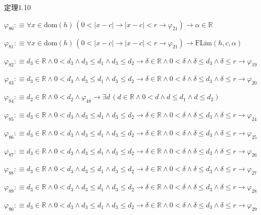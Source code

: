 \begin{fullproof}{定理1.10}
\begin{abbrevlist}
\item $\varphi_{80} :\equiv \forall x \in \mathrm{dom}(h)\,(0 < \lvert x - c \rvert \to \lvert x - c \rvert < r \to \varphi_{21}) \to \alpha \in \mathbb{R}$
\item $\varphi_{81} :\equiv \forall x \in \mathrm{dom}(h)\,(0 < \lvert x - c \rvert \to \lvert x - c \rvert < r \to \varphi_{21}) \to \mathrm{FLim}(h,c,\alpha)$
\item $\varphi_{82} :\equiv d_{3} \in \mathbb{R} \land 0 < d_{3} \land d_{3} \leq d_{1} \land d_{3} \leq d_{2} \to \delta \in \mathbb{R} \land 0 < \delta \land \delta \leq d_{3} \land \delta \leq r \to \varphi_{19}$
\item $\varphi_{83} :\equiv d_{3} \in \mathbb{R} \land 0 < d_{3} \land d_{3} \leq d_{1} \land d_{3} \leq d_{2} \to \delta \in \mathbb{R} \land 0 < \delta \land \delta \leq d_{3} \land \delta \leq r \to \varphi_{20}$
\item $\varphi_{84} :\equiv d_{2} \in \mathbb{R} \land 0 < d_{2} \land \varphi_{48} \to \exists d\,(d \in \mathbb{R} \land 0 < d \land d \leq d_{1} \land d \leq d_{2})$
\item $\varphi_{85} :\equiv d_{3} \in \mathbb{R} \land 0 < d_{3} \land d_{3} \leq d_{1} \land d_{3} \leq d_{2} \to \delta \in \mathbb{R} \land 0 < \delta \land \delta \leq d_{3} \land \delta \leq r \to \varphi_{24}$
\item $\varphi_{86} :\equiv d_{3} \in \mathbb{R} \land 0 < d_{3} \land d_{3} \leq d_{1} \land d_{3} \leq d_{2} \to \delta \in \mathbb{R} \land 0 < \delta \land \delta \leq d_{3} \land \delta \leq r \to \varphi_{25}$
\item $\varphi_{87} :\equiv d_{3} \in \mathbb{R} \land 0 < d_{3} \land d_{3} \leq d_{1} \land d_{3} \leq d_{2} \to \delta \in \mathbb{R} \land 0 < \delta \land \delta \leq d_{3} \land \delta \leq r \to \varphi_{26}$
\item $\varphi_{88} :\equiv d_{3} \in \mathbb{R} \land 0 < d_{3} \land d_{3} \leq d_{1} \land d_{3} \leq d_{2} \to \delta \in \mathbb{R} \land 0 < \delta \land \delta \leq d_{3} \land \delta \leq r \to \varphi_{27}$
\item $\varphi_{89} :\equiv d_{3} \in \mathbb{R} \land 0 < d_{3} \land d_{3} \leq d_{1} \land d_{3} \leq d_{2} \to \delta \in \mathbb{R} \land 0 < \delta \land \delta \leq d_{3} \land \delta \leq r \to \varphi_{28}$
\item $\varphi_{90} :\equiv d_{3} \in \mathbb{R} \land 0 < d_{3} \land d_{3} \leq d_{1} \land d_{3} \leq d_{2} \to \delta \in \mathbb{R} \land 0 < \delta \land \delta \leq d_{3} \land \delta \leq r \to \varphi_{29}$

\end{abbrevlist}
\end{fullproof}
